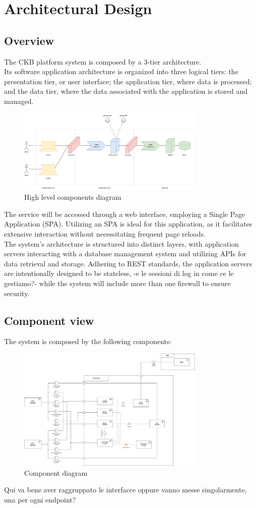 \chapter{Architectural Design}

\section{Overview}
The CKB platform system is composed by a 3-tier architecture.\\
Its software application architecture is organized into three logical tiers: the presentation tier, or user interface; the application tier, where data is processed; and the data tier, where the data associated with the application is stored and managed.

\begin{figure}[H]
\centering
\includegraphics[width=0.8\textwidth]{images/diagrams/high_level_diagram.png}
\caption{High level components diagram}
\end{figure}

The service will be accessed through a web interface, employing a Single Page Application (SPA). Utilizing an SPA is ideal for this application, as it facilitates extensive interaction without necessitating frequent page reloads.\\
The system's architecture is structured into distinct layers, with application servers interacting with a database management system and utilizing APIs for data retrieval and storage. {\color{red}Adhering to REST standards, the application servers are intentionally designed to be stateless, -e le sessioni di log in come ce le gestiamo?-} while the system will include more than one firewall to ensure security.\\

\section{Component view}
The system is composed by the following components:

\begin{figure}[H]
\centering
\includegraphics[width=0.8\textwidth]{images/diagrams/component_diagram.png}
\caption{Component diagram}
\end{figure}

{\color{red}Qui va bene aver raggruppato le interfacce oppure vanno messe singolarmente, una per ogni endpoint?}